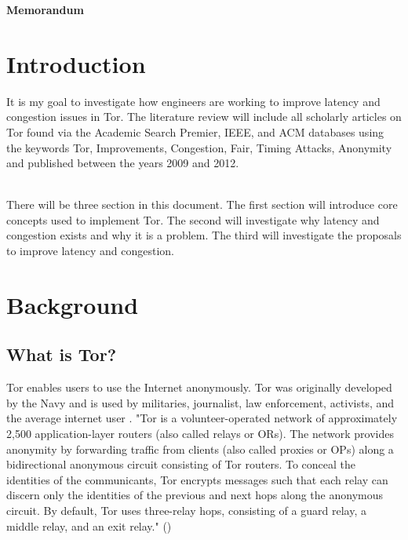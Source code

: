 \documentclass[letterpaper,13pt]{texMemo}
\begin{document}
\singlespace
\begin{center}
\large {\bf Memorandum}
\end{center}
\setlength{\topmargin}{0in}
\maketitle
\section*{Introduction}
\noindent
It is my goal to investigate how engineers are working to improve latency and congestion issues in
Tor. The literature review will include all scholarly articles on Tor found via the Academic Search
Premier, IEEE, and ACM databases using the keywords Tor, Improvements, Congestion, Fair, Timing
Attacks, Anonymity and published between the years 2009 and 2012.

\noindent
\\There will be three section in this document. The first section will introduce core concepts used to
implement Tor. The second will investigate why latency and congestion exists and why it is a
problem. The third will investigate the proposals to improve latency and congestion.

\section*{Background}

    \subsection*{What is Tor?}
    Tor enables users to use the Internet anonymously. Tor was originally developed by the Navy
    and is used by militaries, journalist, law enforcement, activists, and the average internet user
    \citep[2]{Tor:web}. 
    "Tor is a volunteer-operated network of approximately 2,500 application-layer routers (also
    called relays or ORs). The network provides anonymity by forwarding traffic from clients (also
    called proxies or OPs) along a bidirectional anonymous circuit consisting of Tor routers. To
    conceal the identities of the communicants, Tor encrypts messages such that each relay can
    discern only the identities of the previous and next hops along the anonymous circuit.  By
    default, Tor uses three-relay hops, consisting of a guard relay, a middle relay, and an exit
    relay." (\citeauthor[1]{Moore})
\end{document}
